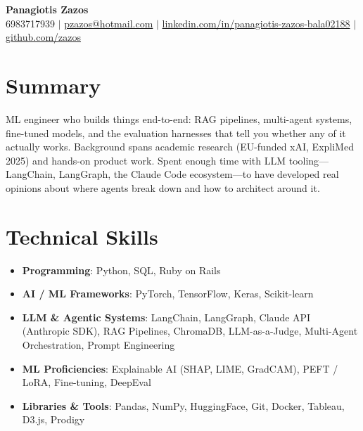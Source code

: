\documentclass[letterpaper,10pt]{article}
\newcommand{\resumeItem}[1]{\item\small{#1}}
\newcommand{\resumeSubHeadingList}{\begin{itemize}[leftmargin=0.15in, label={}]}
\newcommand{\resumeSubHeadingListEnd}{\end{itemize}}
\begin{document}
\begin{center}
  \textbf{\Huge Panagiotis Zazos} \\
  \small 6983717939 $|$ \href{mailto:pzazos@hotmail.com}{pzazos@hotmail.com} $|$ 
  \href{https://www.linkedin.com/in/panagiotis-zazos-bala02188/}{linkedin.com/in/panagiotis-zazos-bala02188} $|$
  \href{https://github.com/zazos}{github.com/zazos}
\end{center}

\section*{Summary}
ML engineer who builds things end-to-end: RAG pipelines, multi-agent systems, fine-tuned models, and the evaluation harnesses that tell you whether any of it actually works. Background spans academic research (EU-funded xAI, ExpliMed 2025) and hands-on product work. Spent enough time with LLM tooling—LangChain, LangGraph, the Claude Code ecosystem—to have developed real opinions about where agents break down and how to architect around it.

\section{Technical Skills}
\resumeSubHeadingList
  \resumeItem{\textbf{Programming}: Python, SQL, Ruby on Rails}
  \resumeItem{\textbf{AI / ML Frameworks}: PyTorch, TensorFlow, Keras, Scikit-learn}
  \resumeItem{\textbf{LLM \& Agentic Systems}: LangChain, LangGraph, Claude API (Anthropic SDK), RAG Pipelines, ChromaDB, LLM-as-a-Judge, Multi-Agent Orchestration, Prompt Engineering}
  \resumeItem{\textbf{ML Proficiencies}: Explainable AI (SHAP, LIME, GradCAM), PEFT / LoRA, Fine-tuning, DeepEval}
  \resumeItem{\textbf{Libraries \& Tools}: Pandas, NumPy, HuggingFace, Git, Docker, Tableau, D3.js, Prodigy}
\resumeSubHeadingListEnd
\end{document}
